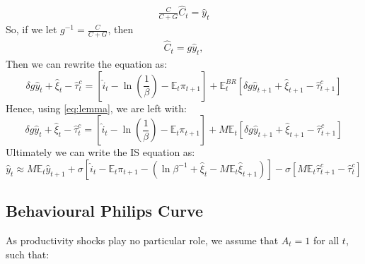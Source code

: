 \documentclass[11pt]{article}
\begin{document}
\begin{spacing}{2}
\begin{align*}
	\frac{C}{C + G} \hat{C}_t = \hat{y}_t
\end{align*}
So, if we let  $g^{-1} = \frac{C}{C + G}$,  then
\begin{align*}
	\hat{C}_t = g\hat{y}_t,
\end{align*}
Then we can rewrite the equation as:
\begin{equation}
	\delta g\hat{y}_t +  \hat{\xi}_t - \hat{\tau}^c_t =  \left[\hat{i}_t - \ln\left(\frac{1}{\beta}\right) - \mathbb{E}_t \pi_{t+1}\right] + \mathbb{E}_t^{BR} \left[\delta g\hat{y}_{t+1} + \hat{\xi}_{t+1} - \hat{\tau}^c_{t+1}\right]
\end{equation}
Hence, using \ref{eq:lemma}, we are left with: 
\begin{equation}
	\delta g\hat{y}_t +  \hat{\xi}_t - \hat{\tau}^c_t =  \left[\hat{i}_t - \ln\left(\frac{1}{\beta}\right) - \mathbb{E}_t \pi_{t+1}\right] + M \mathbb{E}_t \left[\delta g\hat{y}_{t+1} + \hat{\xi}_{t+1} - \hat{\tau}^c_{t+1}\right]
\end{equation}
Ultimately we can write the IS equation as:
\begin{equation}
	\hat{y}_t \approx M \mathbb{E}_t \hat{y}_{t+1} + \sigma \left[\hat{i}_t - \mathbb{E}_t \pi_{t+1} - \left(\ln\beta^{-1} + \hat{\xi}_t - M \mathbb{E}_t \hat{\xi}_{t+1}\right)\right] - \sigma \left[M \mathbb{E}_t \hat{\tau}^c_{t+1} - \hat{\tau}^c_t\right]
\end{equation}

\subsection{Behavioural Philips Curve}
As productivity shocks play no particular role, we assume that $A_t = 1$ for all $t$, such that:


\end{spacing}
\end{document}
